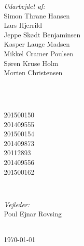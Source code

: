 \begin{titlepage}
		\begin{minipage}{0.4\textwidth}
			\begin{flushleft} \large
				\emph{Udarbejdet af:}\\
				Simon Thrane Hansen \\%
				Lars Hjerrild \\%
				Jeppe Skødt Benjaminsen \\%
				Kasper Lauge Madsen\\ Mikkel Cramer Poulsen\\Søren Kruse Holm\\Morten Christensen
			\end{flushleft}
		\end{minipage}
		~
		\begin{minipage}{0.4\textwidth}
			\begin{flushright} \large
				\ \\
				201500150 \\%
				201409555\\ 	
				201500154\\201409873 	\\20112893 	\\201409556\\ 201500162 	
			\end{flushright}
		\end{minipage}\\[2cm]
		
		
		\begin{minipage}{0.3\textwidth}
			\begin{center} \large
				\emph{Vejleder:} \\
				Poul Ejnar Rovsing	
			\end{center}
		\end{minipage}\\[1cm]
	
		
		
		{\large \today}\\[2cm] %
		
	
		
\end{titlepage}
